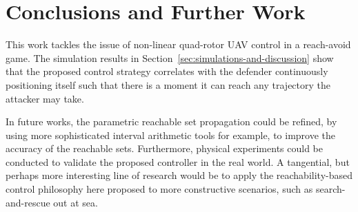\documentclass[letterpaper,10pt,conference]{ieeeconf}
\begin{document}
\section{Conclusions and Further Work}
\label{sec:conclusions-and-further-work}
This work tackles the issue of non-linear quad-rotor UAV control in a reach-avoid game. The simulation results in Section~\ref{sec:simulations-and-discussion} show that the proposed control strategy correlates with the defender continuously positioning itself such that there is a moment it can reach any trajectory the attacker may take.

In future works, the parametric reachable set propagation could be refined, by using more sophisticated interval arithmetic tools for example, to improve the accuracy of the reachable sets. Furthermore, physical experiments could be conducted to validate the proposed controller in the real world. A tangential, but perhaps more interesting line of research would be to apply the reachability-based control philosophy here proposed to more constructive scenarios, such as search-and-rescue out at sea.

\printbibliography

\end{document}
